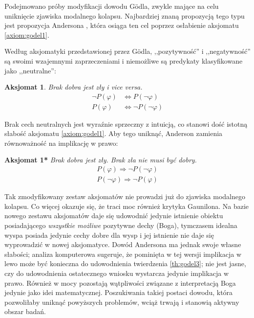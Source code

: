 \documentclass[
	runningheads
]{llncs}
\newtheorem{axiom-pl}{Aksjomat}
\begin{document}
Podejmowano próby modyfikacji dowodu G\"odla, zwykle mające na celu uniknięcie zjawiska modalnego kolapsu. Najbardziej znaną propozycją tego typu jest propozycja Andersona \cite{anderson1990}, która osiąga ten cel poprzez osłabienie aksjomatu \ref{axiom:godel1}. 

Według aksjomatyki przedstawionej przez G\"odla, ,,pozytywność'' i ,,negatywność'' są swoimi wzajemnymi zaprzeczeniami i niemożliwe są predykaty klasyfikowane jako ,,neutralne'':
\begin{axiom-pl}
	Brak dobra jest zły i vice versa. 
	\begin{align*}
	\neg P(\varphi) & \Leftrightarrow P(\neg \varphi) \\ 
	P(\varphi) & \Leftrightarrow \neg P( \neg \varphi )
	\end{align*}
\end{axiom-pl}
Brak cech neutralnych jest wyraźnie sprzeczny z intuicją, co stanowi dość istotną słabość aksjomatu \ref{axiom:godel1}. Aby tego uniknąć, Anderson zamienia równoważność na implikację w prawo:

\vspace*{0.2cm}
\noindent\textbf{Aksjomat 1*} \hspace*{0.1cm}
\textit{Brak dobra jest zły. Brak zła nie musi być dobry. }
\begin{align*}
	P(\varphi) \Rightarrow \neg P( \neg \varphi ) \\ 
	P( \neg \varphi ) \Rightarrow \neg P(\varphi)
\end{align*}

Tak zmodyfikowany zestaw aksjomatów nie prowadzi już do zjawiska modalnego kolapsu. Co więcej okazuje się, że traci moc również krytyka Gaunilona. Na bazie nowego zestawu aksjomatów daje się udowodnić jedynie istnienie obiektu posiadającego \emph{wszystkie możliwe} pozytywne dechy (Boga), tymczasem idealna wyspa posiada jedynie cechy dobre dla wysp i jej istnienie nie daje się wyprowadzić w nowej aksjomatyce. Dowód Andersona ma jednak swoje własne słabości; analiza komputerowa \cite{benzmuller2016} sugeruje, że pominięta w tej wersji implikacja w lewo może być konieczna do udowodnienia twierdzenia \ref{th:godel3}; nie jest jasne, czy do udowodnienia ostatecznego wniosku wystarcza jedynie implikacja w prawo. Również w mocy pozostają wątpliwości związane z interpretacją Boga jedynie jako idei matematycznej. Poszukiwania takiej postaci dowodu, która pozwoliłaby uniknąć powyższych problemów, wciąż trwają i stanowią aktywny obszar badań. 
\end{document}
